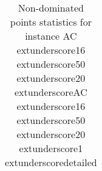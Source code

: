 \begin{table}
\caption{Non-dominated points statistics for instance AC	extunderscore16	extunderscore50	extunderscore20	extunderscoreAC	extunderscore16	extunderscore50	extunderscore20	extunderscore1	extunderscoredetailed}
\label{tab:stats/AC_16_50_20_AC_16_50_20_1_detailed}
\begin{tabular}{}
\toprule
\midrule
\bottomrule
\end{tabular}
\end{table}
